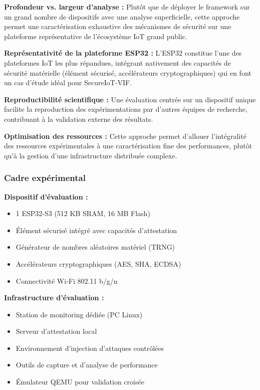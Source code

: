 \textbf{Profondeur vs. largeur d'analyse :} Plutôt que de déployer le framework sur un grand nombre de dispositifs avec une analyse superficielle, cette approche permet une caractérisation exhaustive des mécanismes de sécurité sur une plateforme représentative de l'écosystème IoT grand public.

\textbf{Représentativité de la plateforme ESP32 :} L'ESP32 constitue l'une des plateformes IoT les plus répandues, intégrant nativement des capacités de sécurité matérielle (élément sécurisé, accélérateurs cryptographiques) qui en font un cas d'étude idéal pour SecureIoT-VIF.

\textbf{Reproductibilité scientifique :} Une évaluation centrée sur un dispositif unique facilite la reproduction des expérimentations par d'autres équipes de recherche, contribuant à la validation externe des résultats.

\textbf{Optimisation des ressources :} Cette approche permet d'allouer l'intégralité des ressources expérimentales à une caractérisation fine des performances, plutôt qu'à la gestion d'une infrastructure distribuée complexe.

\subsubsection{Cadre expérimental}

\textbf{Dispositif d'évaluation :}
\begin{itemize}
    \item 1 ESP32-S3 (512 KB SRAM, 16 MB Flash)
    \item Élément sécurisé intégré avec capacités d'attestation
    \item Générateur de nombres aléatoires matériel (TRNG)
    \item Accélérateurs cryptographiques (AES, SHA, ECDSA)
    \item Connectivité Wi-Fi 802.11 b/g/n
\end{itemize}

\textbf{Infrastructure d'évaluation :}
\begin{itemize}
    \item Station de monitoring dédiée (PC Linux)
    \item Serveur d'attestation local
    \item Environnement d'injection d'attaques contrôlées
    \item Outils de capture et d'analyse de performance
    \item Émulateur QEMU pour validation croisée
\end{itemize}

